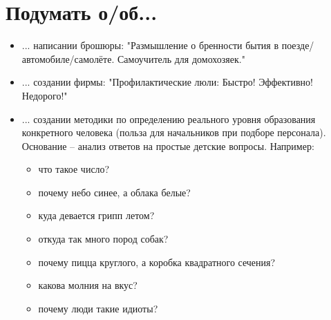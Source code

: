 \section{Подумать о/об...}
\begin{itemize}
\item ... написании брошюры: "Размышление о бренности бытия в поезде/автомобиле/самолёте. Самоучитель для домохозяек."
\item ... создании фирмы: "Профилактические люли: Быстро! Эффективно! Недорого!"
\item ...  создании методики по определению реального уровня образования конкретного человека (польза для начальников при подборе персонала). Основание -- анализ ответов на простые детские вопросы.
Например:
    \begin{itemize}
        \item что такое число?
        \item почему небо синее, а облака белые?
        \item куда девается грипп летом?
        \item откуда так много пород собак?
        \item почему пицца круглого, а коробка квадратного сечения?
        \item какова молния на вкус?
        \item почему люди такие идиоты?
    \end{itemize}
\end{itemize}

